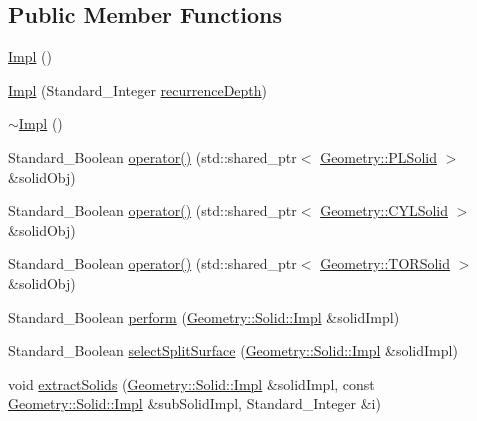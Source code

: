 \subsection*{Public Member Functions}
\begin{DoxyCompactItemize}
\item 
\hyperlink{classMcCAD_1_1Decomposition_1_1DecomposeSolid_1_1Impl_aa6127a34d15e303ba1f6759de099a2aa}{Impl} ()
\item 
\hyperlink{classMcCAD_1_1Decomposition_1_1DecomposeSolid_1_1Impl_a7fe8e66fd558070fdb9f08e2a0013357}{Impl} (Standard\+\_\+\+Integer \hyperlink{classMcCAD_1_1Decomposition_1_1DecomposeSolid_1_1Impl_ad908b2687b52f636d8368b814aa5f770}{recurrence\+Depth})
\item 
\hyperlink{classMcCAD_1_1Decomposition_1_1DecomposeSolid_1_1Impl_af8f2e7a534dc2c7bb8d9553a3e6df4e2}{$\sim$\+Impl} ()
\item 
Standard\+\_\+\+Boolean \hyperlink{classMcCAD_1_1Decomposition_1_1DecomposeSolid_1_1Impl_a72113129aea63c20631338a8f5d4022b}{operator()} (std\+::shared\+\_\+ptr$<$ \hyperlink{classMcCAD_1_1Geometry_1_1PLSolid}{Geometry\+::\+P\+L\+Solid} $>$ \&solid\+Obj)
\item 
Standard\+\_\+\+Boolean \hyperlink{classMcCAD_1_1Decomposition_1_1DecomposeSolid_1_1Impl_a8038247034f4fbe8ac347bd59bbfe8c9}{operator()} (std\+::shared\+\_\+ptr$<$ \hyperlink{classMcCAD_1_1Geometry_1_1CYLSolid}{Geometry\+::\+C\+Y\+L\+Solid} $>$ \&solid\+Obj)
\item 
Standard\+\_\+\+Boolean \hyperlink{classMcCAD_1_1Decomposition_1_1DecomposeSolid_1_1Impl_ad71d1518625461aa5c67c85dba1c700d}{operator()} (std\+::shared\+\_\+ptr$<$ \hyperlink{classMcCAD_1_1Geometry_1_1TORSolid}{Geometry\+::\+T\+O\+R\+Solid} $>$ \&solid\+Obj)
\item 
Standard\+\_\+\+Boolean \hyperlink{classMcCAD_1_1Decomposition_1_1DecomposeSolid_1_1Impl_aa65d0c829adf71764f3d1954cd8d6829}{perform} (\hyperlink{classMcCAD_1_1Geometry_1_1Solid_1_1Impl}{Geometry\+::\+Solid\+::\+Impl} \&solid\+Impl)
\item 
Standard\+\_\+\+Boolean \hyperlink{classMcCAD_1_1Decomposition_1_1DecomposeSolid_1_1Impl_a99e2391d75cc9f871a0cb9f984b67e24}{select\+Split\+Surface} (\hyperlink{classMcCAD_1_1Geometry_1_1Solid_1_1Impl}{Geometry\+::\+Solid\+::\+Impl} \&solid\+Impl)
\item 
void \hyperlink{classMcCAD_1_1Decomposition_1_1DecomposeSolid_1_1Impl_a80861ddb3269bb59b3f2333201836e43}{extract\+Solids} (\hyperlink{classMcCAD_1_1Geometry_1_1Solid_1_1Impl}{Geometry\+::\+Solid\+::\+Impl} \&solid\+Impl, const \hyperlink{classMcCAD_1_1Geometry_1_1Solid_1_1Impl}{Geometry\+::\+Solid\+::\+Impl} \&sub\+Solid\+Impl, Standard\+\_\+\+Integer \&i)

\end{DoxyCompactItemize}
